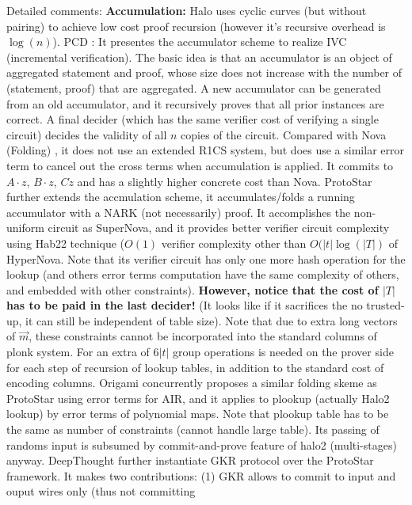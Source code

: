 Detailed comments: {\bf Accumulation:}
Halo \cite{Halo} uses cyclic curves (but without pairing)
to achieve low cost proof recursion (however it's recursive
overhead is $\log(n)$).
PCD \cite{PCD20}: It presentes the accumulator scheme to realize
IVC (incremental verification). The basic idea is that an accumulator
is an object of aggregated statement and proof, whose size
does not increase with the number of (statement, proof) that
are aggregated. A new accumulator can be generated from 
an old accumulator, and it recursively proves that all prior
instances are correct. A final decider (which has the same
verifier cost of verifying a single circuit) decides the
validity of all $n$ copies of the circuit.  Compared with Nova (Folding)
\cite{Nova}, it does not use an extended R1CS system, but does
use a similar error term to cancel out the cross terms when
accumulation is applied. It commits to $A \cdot z$, $B \cdot z$,
$C \dot z$ and has a slightly higher concrete cost than Nova.
ProtoStar \cite{ProtoStar} further extends the accmulation scheme,
it accumulates/folds a running accumulator with a NARK (not necessarily)
proof. It accomplishes the non-uniform circuit as SuperNova,
and it provides better verifier circuit complexity using
Hab22 \cite{Hab22} technique ($O(1)$ verifier complexity other than
$O(|t| \log(|T|)$ of HyperNova.  Note that its verifier circuit
has only one more hash operation for the lookup (and others 
error terms computation have the same complexity of others, and
embedded with other constraints). {\bf However, notice that
the cost of $|T|$ has to be paid in the last decider!} (It looks like
if it sacrifices the no trusted-up, it can still be independent
of table size). Note that due to extra long vectors of
$\vec{m}$, these constraints cannot be incorporated into the standard
columns of plonk system. For an extra of $6|t|$ group operations
is needed on the prover side for each step of recursion of
lookup tables, in addition to the standard cost of encoding columns.
Origami \cite{Origami} concurrently proposes a similar folding
skeme as ProtoStar using error terms for AIR, and it applies to
plookup (actually Halo2 lookup) by error terms of polynomial maps.
Note that plookup table has to be the same as number of constraints (cannot
handle large table). Its passing of randoms input is subsumed
by commit-and-prove feature of halo2 (multi-stages) anyway.
DeepThought \cite{DeepThought} further instantiate GKR protocol
over the ProtoStar framework. It makes two contributions: (1) GKR
allows to commit to input and ouput wires only (thus not committing
